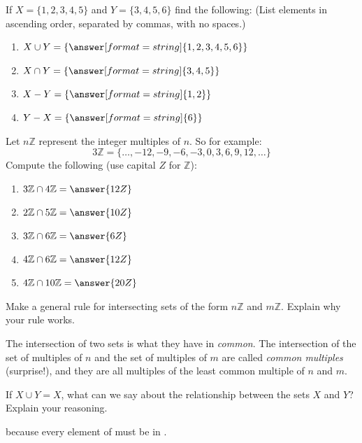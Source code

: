 \documentclass[nooutcomes]{ximera}
\renewcommand{\Z}{\mathbb Z}
\begin{document}
\begin{problem}
If $X = \{1,2,3,4,5\}$ and $Y = \{3,4,5,6\}$ find the following: (List elements in ascending order, separated by commas, with no spaces.)
\begin{enumerate}
\item $X\cup Y = \{\answer[format=string]{1,2,3,4,5,6}\}$
\item $X\cap Y = \{\answer[format=string]{3,4,5}\}$
\item $X-Y = \{\answer[format=string]{1,2}\}$
\item $Y-X = \{\answer[format=string]{6}\}$
\end{enumerate}
\end{problem}

\begin{problem}
Let $n\Z$ represent the integer multiples of $n$. So for example:
\[
3\Z = \{\dots,-12,-9,-6,-3,0,3,6,9,12,\dots\}
\]
Compute the following (use capital $Z$ for $\Z$):
\begin{enumerate}
\item $3\Z\cap 4\Z = \answer{12Z}$ 
\item $2\Z\cap 5\Z = \answer{10Z}$
\item $3\Z\cap 6\Z = \answer{6Z}$
\item $4\Z\cap 6\Z = \answer{12Z}$
\item $4\Z\cap 10\Z = \answer{20Z}$
\end{enumerate}
\end{problem}

\begin{problem}
Make a general rule for intersecting sets of the form $n\Z$ and
  $m\Z$. Explain why your rule works.
\begin{freeResponse}
\begin{hint}
The intersection of two sets is what they have in \emph{common}.  The intersection of the set of multiples of $n$ and the set of multiples of $m$ are called \emph{common multiples} (surprise!), and they are all multiples of the least common multiple of $n$ and $m$.  
\end{hint}
\end{freeResponse}
\end{problem}

\begin{problem}
If $X\cup Y = X$, what can we say about the relationship between the sets $X$ and $Y$? Explain your reasoning.

because every element of  must be in .

\end{problem}
\end{document}

